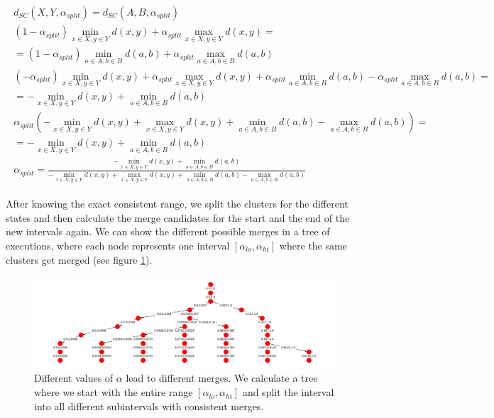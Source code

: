 \begin{equation}
    \begin{aligned}
        \begin{gathered}
        d_{SC}(X,Y,\alpha_{split}) = d_{SC}(A,B,\alpha_{split})\\
        (1 - \alpha_{split}) \min\limits_{x \in X, y \in Y} d(x,y) + \alpha_{split} \max\limits_{x \in X, y \in Y} d(x,y) = \\
        = (1 - \alpha_{split}) \min\limits_{a \in A, b \in B} d(a,b) + \alpha_{split} \max\limits_{a \in A, b \in B} d(a,b)\\
        (- \alpha_{split}) \min\limits_{x \in X, y \in Y} d(x,y) + \alpha_{split} \max\limits_{x \in X, y \in Y} d(x,y) + \alpha_{split} \min\limits_{a \in A, b \in B} d(a,b) - \alpha_{split} \max\limits_{a \in A, b \in B} d(a,b) =\\
        = - \min\limits_{x \in X, y \in Y} d(x,y) + \min\limits_{a \in A, b \in B} d(a,b)\\
        \alpha_{split} (- \min\limits_{x \in X, y \in Y} d(x,y) + \max\limits_{x \in X, y \in Y} d(x,y) + \min\limits_{a \in A, b \in B} d(a,b) - \max\limits_{a \in A, b \in B} d(a,b)) =\\
        = - \min\limits_{x \in X, y \in Y} d(x,y) + \min\limits_{a \in A, b \in B} d(a,b)\\
        \alpha_{split} = \frac{- \min\limits_{x \in X, y \in Y} d(x,y) + \min\limits_{a \in A, b \in B} d(a,b)}{- \min\limits_{x \in X, y \in Y} d(x,y) + \max\limits_{x \in X, y \in Y} d(x,y) + \min\limits_{a \in A, b \in B} d(a,b) - \max\limits_{a \in A, b \in B} d(a,b)}
    \end{gathered}
    \end{aligned}
    \label{eq:equalizesc}
\end{equation}

After knowing the exact consistent range, we split the clusters for the different states and then calculate the merge candidates for the start and the end of the new intervals again. We can show the different possible merges in a tree of executions, where each node represents one interval $[\alpha_{lo}, \alpha_{hi}]$ where the same clusters get merged (see figure \ref{fig:toe}).

\begin{figure}[H]
    \centering
    \includegraphics[width=\textwidth]{images/res_tree}
    \caption{Different values of $\alpha$ lead to different merges. We calculate a tree where we start with the entire range $[\alpha_{lo}, \alpha_{hi}]$ and split the interval into all different subintervals with consistent merges.}
    \label{fig:toe}
\end{figure}

